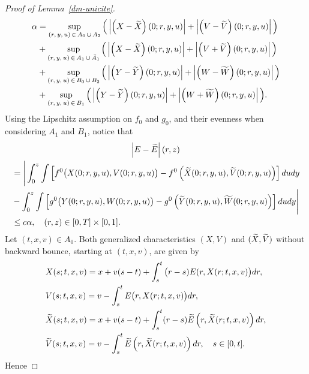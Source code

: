 \documentclass[AHL,Unicode,longabstracts,published]{cedram}
\let\oldtilde\tilde
\renewcommand*{\tilde}[1]{\mathchoice{\widetilde{#1}}{\widetilde{#1}}{\oldtilde{#1}}{\oldtilde{#1}}}
\begin{document}
\begin{proof}[{Proof of Lemma~\ref{dm-unicite}}]
\begin{align*}
\alpha &= \sup _{\left(r,\,y,\,u\right)\,\in\, A_0\,\cup\,A_2}\Big(\left| \left(X-\tilde{X}\right)(0;r,y,u)\right| +\left| \left(V-\tilde{V}\right)(0;r,y,u)\right| \Big) \\
&+\sup _{\left(r,\,y,\,u\right)\,\in\,A_1\,\cup \,\bar{A}_1}\Big(\left| \left(X-\tilde{X}\right)(0;r,y,u)\right| +\left| \left(V+\tilde{V}\right)(0;r,y,u)\right| \Big) \\
&+\sup _{\left(r,\,y,\,u\right)\,\in\,B_0\,\cup \,B_2}\Big(\left| \left(Y-\tilde{Y}\right)(0;r,y,u)\right| +\left| \left(W-\tilde{W}\right)(0;r,y,u)\right| \Big) \\
&+\sup _{\left(r,\,y,\,u\right)\,\in\,B_1}\Big(\left| \left(Y-\tilde{Y}\right)(0;r,y,u)\right| +\left| \left(W+\tilde{W}\right)(0;r,y,u)\right| \Big).
\end{align*}
Using the Lipschitz assumption on $f_0$ and $g_0$, and their evenness when considering $A_1$ and $B_1$, notice that
\begin{multline*}
\left|E-\tilde{E}\right|(r,z)\\
\begin{aligned}
&= \Bigg | \int_0^z\int \left[f^0\big(X(0; r,y,u),V(0;r,y,u)\big)-f ^0\left(\tilde{X}(0;r,y,u),\tilde{V}(0;r,y,u)\right) \right] dudy \\
&-\int_0^z\int \left [g^0\big(Y(0; r,y,u),W(0;r,y,u)\big)-g ^0\left(\tilde{Y}(0;r,y,u),\tilde{W}(0;r,y,u)\right) \right] dudy \Bigg | \\
&\leq c\alpha, \quad (r,z) \in [0,T] \times [0,1].
\end{aligned}
\end{multline*}
Let $(t,x,v)\in A_0$. Both generalized characteristics $(X,V)$ and $(\tilde{X},\tilde{V})$ without backward bounce, starting at $(t,x,v)$, are given by
\begin{align*}
&X(s;t,x,v)= x+v(s-t)+\int_s^t \big(r-s)E(r,X(r;t,x,v)\big)dr, \\
&V(s;t,x,v)= v-\int_s^t E\big(r,X(r;t,x,v)\big)dr, \\
&\tilde{X}(s;t,x,v)= x+v(s-t)+\int_s^t (r-s)\tilde{E}\left(r,\tilde{X}(r;t,x,v)\right)dr, \\
&\tilde{V}(s;t,x,v)= v-\int_s^t \tilde{E}\left(r,\tilde{X}(r;t,x,v)\right)dr,\quad s\in [0,t].
\end{align*}
Hence


\end{proof}
\end{document}
